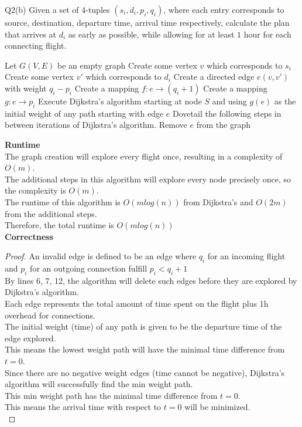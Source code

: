 \begin{problem}
  {Q2(b)}
  Given a set of 4-tuples $(s_i, d_i, p_i, q_i)$, where each entry corresponds to source, destination, departure time, arrival time respectively, calculate
  the plan that arrives at $d_i$ as early as possible, while allowing for at least $1$ hour for each connecting flight. \\
  \begin{algorithmic}[1]
    \STATE Let $G(V,E)$ be an empty graph
    \STATE Create some vertex $v$ which corresponds to $s_i$
    \STATE Create some vertex $v'$ which corresponds to $d_i$
    \STATE Create a directed edge $e(v, v')$ with weight $q_i - p_i$
    \STATE Create a mapping $f: e \rightarrow (q_i + 1)$
    \STATE Create a mapping $g: e \rightarrow p_i$
    \ENDFOR
    \STATE Execute Dijkstra's algorithm starting at node $S$ and using $g(e)$ as the initial weight of any path starting with edge $e$
    \STATE Dovetail the following steps in between iterations of Dijkstra's algorithm.
    \STATE Remove $e$ from the graph
    \ENDIF
    \ENDFOR
  \end{algorithmic}
  \textbf{Runtime}\\
  The graph creation will explore every flight once, resulting in a complexity of $O(m)$. \\
  The additional steps in this algorithm will explore every node precisely once, so the complexity is $O(m)$. \\
  The runtime of this algorithm is $O(mlog(n))$ from Dijkstra's and $O(2m)$ from the additional steps. \\
  Therefore, the total runtime is $O(mlog(n))$ \\
  \textbf{Correctness}
  \begin{proof}
    An invalid edge is defined to be an edge where $q_i$ for an incoming flight and $p_i$ for an outgoing connection fulfill $p_i < q_i + 1$ \\
    By lines 6, 7, 12, the algorithm will delete such edges before they are explored by Dijkstra's algorithm. \\
    Each edge represents the total amount of time spent on the flight plus 1h overhead for connections. \\
    The initial weight (time) of any path is given to be the departure time of the edge explored. \\
    This means the lowest weight path will have the minimal time difference from $t=0$. \\
    Since there are no negative weight edges (time cannot be negative), Dijkstra's algorithm will successfully find the min weight path. \\
    This min weight path has the minimal time difference from $t=0$. \\
    This means the arrival time with respect to $t=0$ will be minimized. \\
  \end{proof}
\end{problem}
